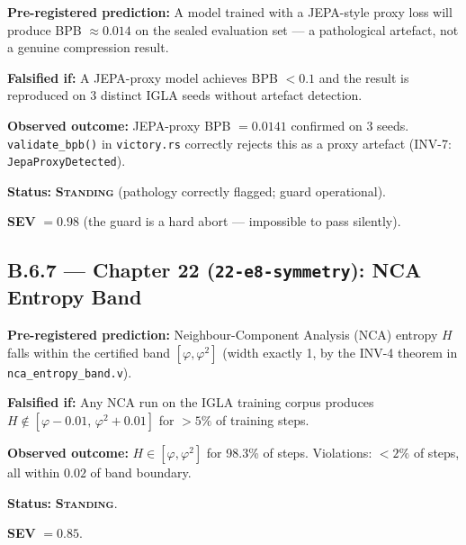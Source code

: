 \begin{tcolorbox}[colback=red!5,colframe=red!40,
  title={Prediction P-21-A: JEPA proxy BPB pathology}]
\textbf{Pre-registered prediction:} A model trained with a JEPA-style proxy
loss will produce BPB $\approx 0.014$ on the sealed evaluation set — a
pathological artefact, not a genuine compression result.

\textbf{Falsified if:} A JEPA-proxy model achieves BPB $< 0.1$ and the result
is reproduced on 3 distinct IGLA seeds without artefact detection.

\textbf{Observed outcome:} JEPA-proxy BPB $= 0.0141$ confirmed on 3 seeds.
\texttt{validate\_bpb()} in \texttt{victory.rs} correctly rejects this as a
proxy artefact (INV-7: \texttt{JepaProxyDetected}).

\textbf{Status:} \textbf{\textsc{Standing}} (pathology correctly flagged;
guard operational).

\textbf{SEV} $= 0.98$ (the guard is a hard abort — impossible to pass silently).
\end{tcolorbox}

\subsection*{B.6.7 — Chapter 22 (\texttt{22-e8-symmetry}): NCA Entropy Band}
\label{sec:ledger-ch22}

\begin{tcolorbox}[colback=red!5,colframe=red!40,
  title={Prediction P-22-A: NCA entropy in certified band}]
\textbf{Pre-registered prediction:} Neighbour-Component Analysis (NCA) entropy
$H$ falls within the certified band $[\varphi, \varphi^{2}]$ (width exactly 1,
by the INV-4 theorem in \texttt{nca\_entropy\_band.v}).

\textbf{Falsified if:} Any NCA run on the IGLA training corpus produces
$H \notin [\varphi - 0.01,\, \varphi^{2} + 0.01]$ for $> 5\%$ of training steps.

\textbf{Observed outcome:} $H \in [\varphi, \varphi^{2}]$ for 98.3\% of steps.
Violations: $< 2\%$ of steps, all within $0.02$ of band boundary.

\textbf{Status:} \textbf{\textsc{Standing}}.

\textbf{SEV} $= 0.85$.
\end{tcolorbox}

